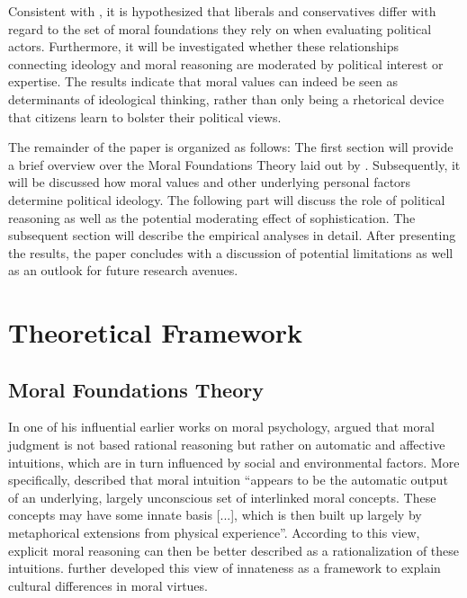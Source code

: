 \documentclass[12pt]{article}
\begin{document}
Consistent with \citet{graham2009liberals}, it is hypothesized that liberals and conservatives differ with regard to the set of moral foundations they rely on when evaluating political actors. Furthermore, it will be investigated whether these relationships connecting ideology and moral reasoning are moderated by political interest or expertise. The results indicate that moral values can indeed be seen as determinants of ideological thinking, rather than only being a rhetorical device that citizens learn to bolster their political views.

The remainder of the paper is organized as follows: The first section will provide a brief overview over the Moral Foundations Theory laid out by \citet{haidt2008moral}. Subsequently, it will be discussed how moral values and other underlying personal factors determine political ideology. The following part will discuss the role of political reasoning as well as the potential moderating effect of sophistication. The subsequent section will describe the empirical analyses in detail. After presenting the results, the paper concludes with a discussion of potential limitations as well as an outlook for future research avenues.


\section{Theoretical Framework}

\subsection{Moral Foundations Theory}

In one of his influential earlier works on moral psychology, \citet{haidt2001emotional} argued that moral judgment is not based rational reasoning but rather on automatic and affective intuitions, which are in turn influenced by social and environmental factors. More specifically, \citet[825]{haidt2001emotional} described that moral intuition ``appears to be the automatic output of an underlying, largely unconscious set of interlinked moral concepts. These concepts may have some innate basis [...], which is then built up largely by metaphorical extensions from physical experience''. According to this view, explicit moral reasoning can then be better described as a rationalization of these intuitions. \citet{haidt2004intuitive} further developed this view of innateness as a framework to explain cultural differences in moral virtues.
\end{document}
